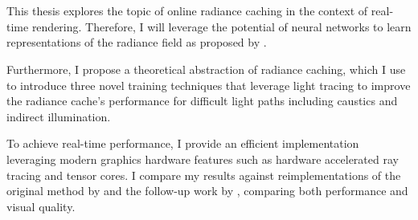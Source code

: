 

\chapter*{}
\label{sec:summary}

This thesis explores the topic of online radiance caching in the context of real-time rendering.
Therefore, I will leverage the potential of neural networks to learn representations of the radiance field as proposed by \textcite{muller2021}.

Furthermore, I propose a theoretical abstraction of radiance caching, which I use to introduce three novel training techniques that leverage light tracing to improve the radiance cache's performance for difficult light paths including caustics and indirect illumination.

To achieve real-time performance, I provide an efficient implementation leveraging modern graphics hardware features such as hardware accelerated ray tracing and tensor cores.
I compare my results against reimplementations of the original method by \textcite{muller2021} and the follow-up work by \textcite{muller2022}, comparing both performance and visual quality.